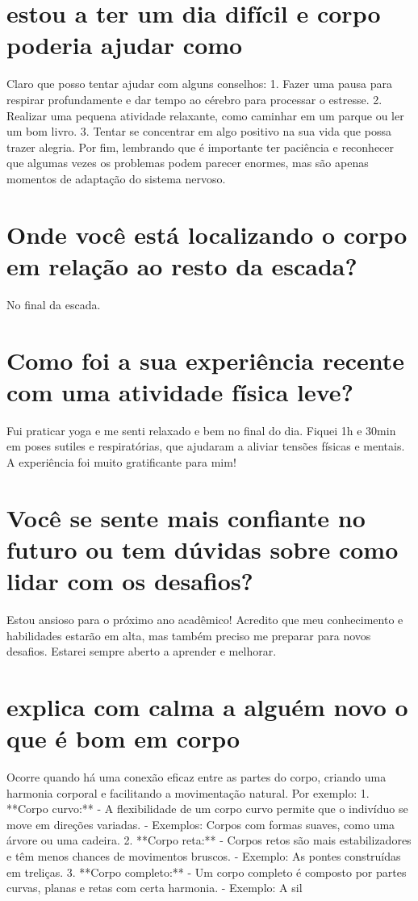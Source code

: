 \documentclass[11pt,a4paper]{article}
\begin{document}
\maketitle
\begin{abstract}Exploração do ollama a partir de sementes banais (nível 3). Teoria continua de fora.\end{abstract}
\section{estou a ter um dia difícil e corpo poderia ajudar como}
Claro que posso tentar ajudar com alguns conselhos: 1. Fazer uma pausa para respirar profundamente e dar tempo ao cérebro para processar o estresse. 2. Realizar uma pequena atividade relaxante, como caminhar em um parque ou ler um bom livro. 3. Tentar se concentrar em algo positivo na sua vida que possa trazer alegria. Por fim, lembrando que é importante ter paciência e reconhecer que algumas vezes os problemas podem parecer enormes, mas são apenas momentos de adaptação do sistema nervoso.

\section{Onde você está localizando o corpo em relação ao resto da escada?}
No final da escada.

\section{Como foi a sua experiência recente com uma atividade física leve?}
Fui praticar yoga e me senti relaxado e bem no final do dia. Fiquei 1h e 30min em poses sutiles e respiratórias, que ajudaram a aliviar tensões físicas e mentais. A experiência foi muito gratificante para mim!

\section{Você se sente mais confiante no futuro ou tem dúvidas sobre como lidar com os desafios?}
Estou ansioso para o próximo ano acadêmico! Acredito que meu conhecimento e habilidades estarão em alta, mas também preciso me preparar para novos desafios. Estarei sempre aberto a aprender e melhorar.

\section{explica com calma a alguém novo o que é bom em corpo}
Ocorre quando há uma conexão eficaz entre as partes do corpo, criando uma harmonia corporal e facilitando a movimentação natural. Por exemplo: 1. **Corpo curvo:** - A flexibilidade de um corpo curvo permite que o indivíduo se move em direções variadas. - Exemplos: Corpos com formas suaves, como uma árvore ou uma cadeira. 2. **Corpo reta:** - Corpos retos são mais estabilizadores e têm menos chances de movimentos bruscos. - Exemplo: As pontes construídas em treliças. 3. **Corpo completo:** - Um corpo completo é composto por partes curvas, planas e retas com certa harmonia. - Exemplo: A sil
\end{document}
